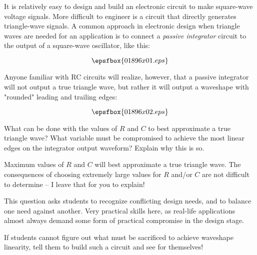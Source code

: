 

It is relatively easy to design and build an electronic circuit to make square-wave voltage signals.  More difficult to engineer is a circuit that directly generates triangle-wave signals.  A common approach in electronic design when triangle waves are needed for an application is to connect a {\it passive integrator} circuit to the output of a square-wave oscillator, like this:

$$\epsfbox{01896x01.eps}$$

Anyone familiar with RC circuits will realize, however, that a passive integrator will not output a true triangle wave, but rather it will output a waveshape with "rounded" leading and trailing edges:

$$\epsfbox{01896x02.eps}$$

What can be done with the values of $R$ and $C$ to best approximate a true triangle wave?  What variable must be compromised to achieve the most linear edges on the integrator output waveform?  Explain why this is so.







Maximum values of $R$ and $C$ will best approximate a true triangle wave.  The consequences of choosing extremely large values for $R$ and/or $C$ are not difficult to determine -- I leave that for you to explain!







This question asks students to recognize conflicting design needs, and to balance one need against another.  Very practical skills here, as real-life applications almost always demand some form of practical compromise in the design stage.

If students cannot figure out what must be sacrificed to achieve waveshape linearity, tell them to build such a circuit and see for themselves!




